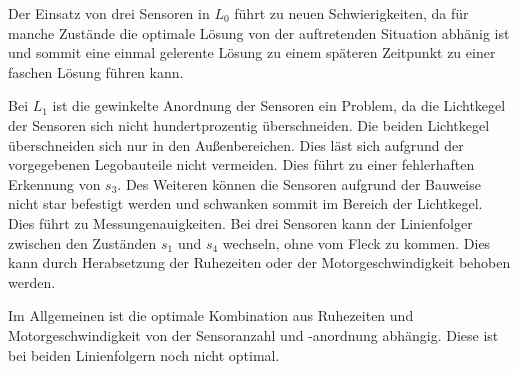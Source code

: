 Der Einsatz von drei Sensoren in $L_0$ führt zu neuen Schwierigkeiten, da für manche Zustände die optimale Lösung von der auftretenden Situation abhänig ist und sommit eine einmal gelerente Lösung zu einem späteren Zeitpunkt zu einer faschen Lösung führen kann.\par
Bei $L_1$ ist die gewinkelte Anordnung der Sensoren ein Problem, da die Lichtkegel der Sensoren sich nicht hundertprozentig überschneiden. Die beiden Lichtkegel überschneiden sich nur in den Außenbereichen. Dies läst sich aufgrund der vorgegebenen Legobauteile nicht vermeiden. Dies führt zu einer fehlerhaften Erkennung von $s_3$. Des Weiteren können die Sensoren aufgrund der Bauweise nicht star befestigt werden und schwanken sommit im Bereich der Lichtkegel. Dies führt zu Messungenauigkeiten. Bei drei Sensoren kann der Linienfolger zwischen den Zuständen $s_1$ und $s_4$ wechseln, ohne vom Fleck zu kommen. Dies kann durch Herabsetzung der Ruhezeiten oder der Motorgeschwindigkeit behoben werden.\par
Im Allgemeinen ist die optimale Kombination aus Ruhezeiten und Motorgeschwindigkeit von der Sensoranzahl und -anordnung abhängig. Diese ist bei beiden Linienfolgern noch nicht optimal. 

